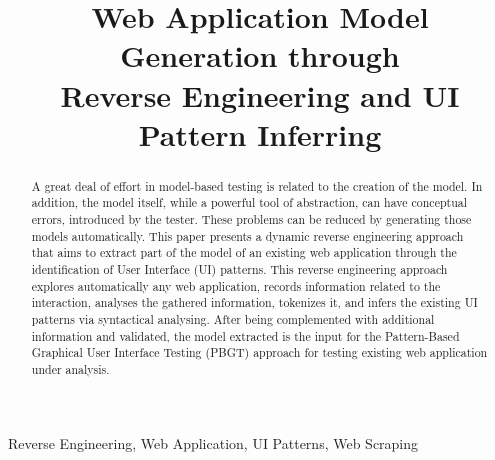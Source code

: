 \documentclass[10pt, conference, compsocconf]{IEEEtran}
\begin{document}
\title{Web Application Model Generation through\\ Reverse Engineering and UI Pattern Inferring}

\author{
\and
{}
}








\maketitle
\begin{abstract}
A great deal of effort in model-based testing is related to the creation of the model. In addition, the model itself, while a powerful tool of abstraction, can have conceptual errors, introduced by the tester. These problems can be reduced by generating those models automatically. This paper presents a dynamic reverse engineering approach that aims to extract part of the model of an existing web application through the identification of User Interface (UI) patterns. This reverse engineering approach explores automatically any web application, records information related to the interaction, analyses the gathered information, tokenizes it, and infers the existing UI patterns via syntactical analysing. After being complemented with additional information and validated, the model extracted is the input for the Pattern-Based Graphical User Interface Testing (PBGT) approach for testing existing web application under analysis.
\end{abstract}
\begin{IEEEkeywords} Reverse Engineering, Web Application, UI Patterns, Web Scraping \end{IEEEkeywords}
\end{document}
